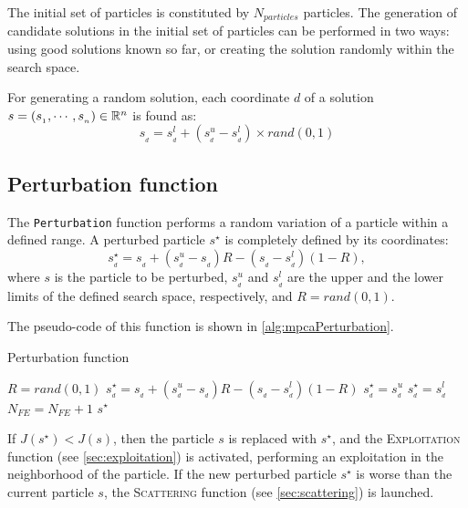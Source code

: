 The initial set of particles is constituted by $N_{particles}$ particles. The generation of candidate solutions in the initial set of particles can be performed in two ways: using good solutions known so far, or creating the solution randomly within the search space.

For generating a random solution, each coordinate $d$ of a solution $s =  \left( s_{_1}, \cdots, s_{_n} \right) \in \mathbb{R}^n$ is found as:
%
\begin{equation}
    \label{eq:newrandom}
    s_{_d} = s^l_{_d} + (s^u_{_d} - s^l_{_d}) \times rand(0,1)
\end{equation}

\subsection{Perturbation function}

The \texttt{Perturbation} function performs a random variation of a particle within a defined range. A perturbed particle $s^\star$ is completely defined by its coordinates:
%
\begin{equation}
s_{_d}^\star = s_{_d} + \left(s^u_{_d} - s_{_d}\right) R - \left(s_{_d} - s^l_{_d}\right) \left(1 - R\right),
\end{equation}
%
where $s$ is the particle to be perturbed, $s^u_{_d}$ and $s^l_{_d}$ are the upper and the lower limits of the defined search space, respectively, and $R = rand(0,1)$.

The pseudo-code of this function is shown in \autoref{alg:mpcaPerturbation}.

\begin{algorithm}[H]
\caption{Perturbation function}
\label{alg:mpcaPerturbation}
\footnotesize
\begin{algorithmic}[1]
\State $R = rand(0,1)$
\State $s_{_d}^\star = s_{_d} + \left(s^u_{_d} - s_{_d}\right) R - \left(s_{_d} - s^l_{_d}\right) \left(1 - R\right)$
\State $s_{_d}^\star = s^u_{_d}$
\State $s_{_d}^\star = s^l_{_d}$
\EndIf
\EndFor
\State $N_{FE} = N_{FE} + 1$
\State \Return $s^\star$
\EndFunction
\end{algorithmic}
\end{algorithm}

If $J(s^\star) < J(s)$, then the particle $s$ is replaced with $s^\star$, and the \textsc{Exploitation} function (see \autoref{sec:exploitation}) is activated, performing an exploitation in the neighborhood of the particle. If the new perturbed particle $s^\star$ is worse than the current particle $s$, the \textsc{Scattering} function (see \autoref{sec:scattering}) is launched.

